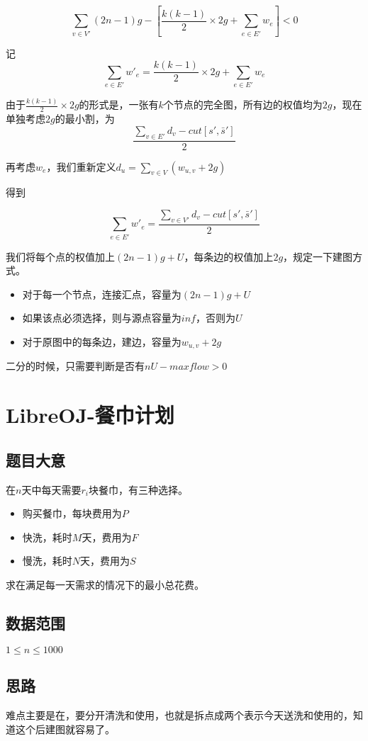 \documentclass{ctexart}
\numberwithin{equation}{section}
\begin{document}
\begin{flushleft}
  $$\sum_{v\in V'}(2n-1)g-\left[\frac{k(k-1)}{2}\times 2g+\sum_{e\in E'}w_e\right] < 0$$

  记$$\sum_{e\in E'}w'_e= \frac{k(k-1)}{2}\times 2g+\sum_{e\in E'}w_e$$

  由于$\frac{k(k-1)}{2}\times 2g$的形式是，一张有$k$个节点的完全图，所有边的权值均为$2g$，现在单独考虑$2g$的最小割，为$$\frac{\sum_{v\in E'}d_v-cut[s',\bar s']}{2}$$

  再考虑$w_e$，我们重新定义$d_u=\sum\limits_{v\in V}(w_{u,v}+2g)$

  得到

  $$\sum_{e\in E'}w'_e=\frac{\sum\limits_{v\in V'}d_v-cut[s', \bar s']}{2}$$

  我们将每个点的权值加上$(2n-1)g+U$，每条边的权值加上$2g$，规定一下建图方式。

  \begin{itemize}
  \item 对于每一个节点，连接汇点，容量为$(2n-1)g+U$
  \item 如果该点必须选择，则与源点容量为$inf$，否则为$U$
  \item 对于原图中的每条边，建边，容量为$w_{u,v}+2g$
  \end{itemize}

  二分的时候，只需要判断是否有$nU-maxflow>0$
  \newpage

  \section{LibreOJ-餐巾计划}
  \subsection{题目大意}
  在$n$天中每天需要$r_i$块餐巾，有三种选择。

  \begin{itemize}
  \item 购买餐巾，每块费用为$P$
  \item 快洗，耗时$M$天，费用为$F$
  \item 慢洗，耗时$N$天，费用为$S$
  \end{itemize}

  求在满足每一天需求的情况下的最小总花费。
  
  \subsection{数据范围}
  $1\le n \le 1000$
  \subsection{思路}
  难点主要是在，要分开清洗和使用，也就是拆点成两个表示今天送洗和使用的，知道这个后建图就容易了。


\end{flushleft}
\end{document}
